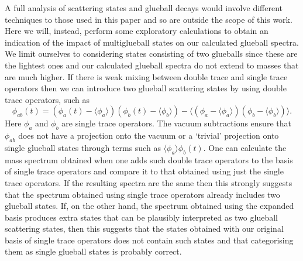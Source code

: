 \documentclass[12pt]{article}
\newcommand{\be}{\begin{equation}}
\newcommand{\ee}{\end{equation}}
\begin{document}
A full analysis of scattering states and glueball decays would involve different
techniques to those used in this paper and so are outside the scope of this work.
Here we will, instead, perform some exploratory calculations to obtain an indication
of the impact of multiglueball states on our calculated glueball spectra. We limit
ourselves to considering states consisting of two glueballs since these are the lightest
ones and our calculated glueball spectra do not extend to masses that are much higher.
If there is weak mixing between double trace and single trace operators then we can
introduce two glueball scattering states by using double trace operators, such as
%
\be
\phi_{ab}(t) = (\phi_a(t)-\langle \phi_a\rangle)(\phi_b(t)-\langle \phi_b\rangle)
-\langle(\phi_a-\langle \phi_a\rangle)(\phi_b-\langle \phi_b\rangle)\rangle.
\label{eqn_phiab}
\ee
%
Here $\phi_a$ and $\phi_b$ are single trace operators. The vacuum subtractions ensure
that $\phi_{ab}$ does not have a projection onto the vacuum or a `trivial' projection
onto single glueball states through terms such as $\langle \phi_a\rangle \phi_b(t)$.
One can calculate the mass spectrum obtained when one adds such double trace operators
to the basis of single trace operators and compare it to that obtained using just the
single trace operators. If the resulting spectra are the same then this strongly
suggests that the spectrum obtained using single trace operators already includes
two glueball states. If, on the other hand, the spectrum obtained using the expanded basis
produces extra states that can be plausibly interpreted as two glueball scattering states,
then this suggests that the states obtained with our original basis of single trace
operators does not contain such states and that categorising them as single glueball
states is probably correct.
\end{document}
